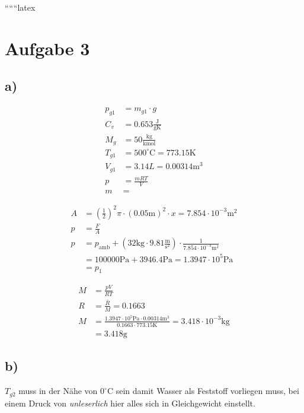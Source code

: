 
``````latex


\section*{Aufgabe 3}

\subsection*{a)}

\begin{align*}
p_{g1} &= m_{g1} \cdot g \\
C_v &= 0.653 \frac{\text{J}}{\text{gK}} \\
M_g &= 50 \frac{\text{kg}}{\text{kmol}} \\
T_{g1} &= 500^\circ \text{C} = 773.15 \text{K} \\
V_{g1} &= 3.14 L = 0.00314 \text{m}^3 \\
p &= \frac{mRT}{V} \\
m &= 
\end{align*}

\begin{align*}
A &= \left( \frac{1}{2} \right)^2 \pi \cdot (0.05 \text{m})^2 \cdot x = 7.854 \cdot 10^{-3} \text{m}^2 \\
p &= \frac{F}{A} \\
p &= p_{\text{amb}} + \left( 32 \text{kg} \cdot 9.81 \frac{\text{m}}{\text{s}^2} \right) \cdot \frac{1}{7.854 \cdot 10^{-3} \text{m}^2} \\
&= 100000 \text{Pa} + 3946.4 \text{Pa} = 1.3947 \cdot 10^5 \text{Pa} \\
&= p_1
\end{align*}

\begin{align*}
M &= \frac{pV}{RT} \\
R &= \frac{\bar{R}}{M} = 0.1663 \\
M &= \frac{1.3947 \cdot 10^5 \text{Pa} \cdot 0.00314 \text{m}^3}{0.1663 \cdot 773.15 \text{K}} = 3.418 \cdot 10^{-3} \text{kg} \\
&= 3.418 \text{g}
\end{align*}

\subsection*{b)}

$T_{g2}$ muss in der Nähe von $0^\circ \text{C}$ sein damit Wasser als Feststoff vorliegen muss, bei einem Druck von \textit{unleserlich} hier alles sich in Gleichgewicht einstellt. 

